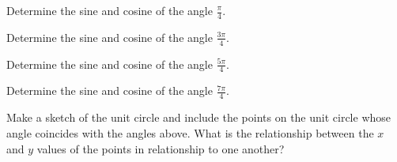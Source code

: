 
\begin{problem}
\item Determine the sine and cosine of the angle $\frac{\pi}{4}$.
  \vfill
\item Determine the sine and cosine of the angle $\frac{3\pi}{4}$.
  \vfill
\item Determine the sine and cosine of the angle $\frac{5\pi}{4}$.
  \vfill
\item Determine the sine and cosine of the angle $\frac{7\pi}{4}$.
  \vfill
\item Make a sketch of the unit circle and include the points on the
  unit circle whose angle coincides with the angles above. What is the
  relationship between the $x$ and $y$ values of the points in relationship
  to one another?
  \vfill
\end{problem}


